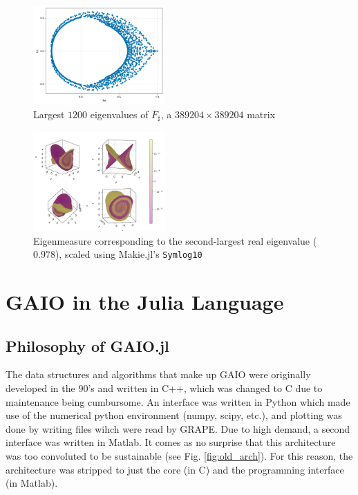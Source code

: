 \documentclass{juliacon}
\begin{document}
\begin{figure}
    \centering
    \includegraphics[width=0.45\textwidth]{spectrum.pdf}
    \caption{Largest $1200$ eigenvalues of $F_\sharp$, a $389204 \times 389204$ matrix}
    \label{fig:spectrum}
\end{figure}

\begin{figure}
    \centering
    \includegraphics[width=0.45\textwidth]{almost_inv.png}
    \caption{Eigenmeasure corresponding to the second-largest real eigenvalue ($0.978$), scaled using Makie.jl's \texttt{Symlog10}}
\end{figure}

\section{GAIO in the Julia Language}

\subsection{Philosophy of GAIO.jl}

The data structures and algorithms that make up GAIO were originally developed in the $90$'s and written in C++, which was changed to C due to maintenance being cumbursome. An interface was written in Python which made use of the numerical python environment (numpy, scipy, etc.), and plotting was done by writing files wihch were read by GRAPE. Due to high demand, a second interface was written in Matlab. It comes as no surprise that this architecture was too convoluted to be sustainable (see Fig. \ref{fig:old_arch}). For this reason, the architecture was stripped to just the core (in C) and the programming interface (in Matlab). 
\end{document}
